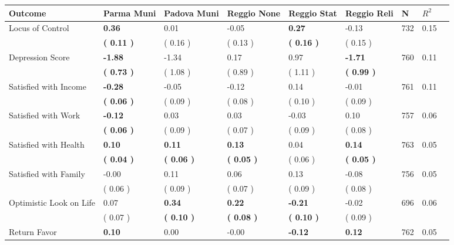 \begin{tabular}{L{6.2cm} C{1.8cm} C{1.8cm} C{1.8cm} C{1.8cm} C{1.8cm} C{1.8cm} C{0.3cm} C{0.3cm}}
\toprule
 \textbf{Outcome} & \textbf{Parma Muni} & \textbf{Padova Muni} & \textbf{Reggio None} & \textbf{Reggio Stat} & \textbf{Reggio Reli} & \textbf{N} & \textbf{$ R^2$} \\
\midrule
Locus of Control & \textbf{     0.36} &      0.01 &     -0.05 & \textbf{     0.27} &     -0.13  & 732 &       0.15 \\ 
 & \textbf{(     0.11 )} & (     0.16 ) & (     0.13 ) & \textbf{(     0.16 )} & (     0.15 )  & \\
Depression Score & \textbf{    -1.88} &     -1.34 &      0.17 &      0.97 & \textbf{    -1.71}  & 760 &       0.11 \\ 
 & \textbf{(     0.73 )} & (     1.08 ) & (     0.89 ) & (     1.11 ) & \textbf{(     0.99 )}  & \\
Satisfied with Income & \textbf{    -0.28} &     -0.05 &     -0.12 &      0.14 &     -0.01  & 761 &       0.11 \\ 
 & \textbf{(     0.06 )} & (     0.09 ) & (     0.08 ) & (     0.10 ) & (     0.09 )  & \\
Satisfied with Work & \textbf{    -0.12} &      0.03 &      0.03 &     -0.03 &      0.10  & 757 &       0.06 \\ 
 & \textbf{(     0.06 )} & (     0.09 ) & (     0.07 ) & (     0.09 ) & (     0.08 )  & \\
Satisfied with Health & \textbf{     0.10} & \textbf{     0.11} & \textbf{     0.13} &      0.04 & \textbf{     0.14}  & 763 &       0.05 \\ 
 & \textbf{(     0.04 )} & \textbf{(     0.06 )} & \textbf{(     0.05 )} & (     0.06 ) & \textbf{(     0.05 )}  & \\
Satisfied with Family &     -0.00 &      0.11 &      0.06 &      0.13 &     -0.08  & 756 &       0.05 \\ 
 & (     0.06 ) & (     0.09 ) & (     0.07 ) & (     0.09 ) & (     0.08 )  & \\
Optimistic Look on Life &      0.07 & \textbf{     0.34} & \textbf{     0.22} & \textbf{    -0.21} &     -0.02  & 696 &       0.06 \\ 
 & (     0.07 ) & \textbf{(     0.10 )} & \textbf{(     0.08 )} & \textbf{(     0.10 )} & (     0.09 )  & \\
Return Favor & \textbf{     0.10} &      0.00 &     -0.00 & \textbf{    -0.12} & \textbf{     0.12}  & 762 &       0.05 \\ 

\end{tabular}

